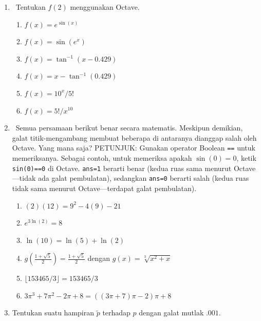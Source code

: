 \begin{enumerate}
\begin{enumerate}
\item $\lfloor\ln(234567)\rfloor$
\item $e^{\lceil\ln(234567)\rceil}$
\item $\sqrt[3]{\lfloor\sin(e^{5.2})\rfloor}$
\item $-e^{i\pi}$
\item $4\tan^{-1}(1)$
\item ${\displaystyle \frac{\lfloor\cos(3)-\sqrt[5]{\ln(3)}\rfloor}{\lceil\arctan(3)-e^{3}\rceil}}$
\end{enumerate}
\item \octave\ Tentukan $f(2)$ menggunakan Octave.

\begin{enumerate}
\item \label{exc:abserr12}$f(x)=e^{\sin(x)}$ \hasasolution 
\item $f(x)=\sin\left(e^{x}\right)$
\item \label{exc:abserr13}${\displaystyle f(x)=\tan^{-1}(x-0.429)}$ \hasasolution 
\item $f(x)=x-\tan^{-1}(0.429)$
\item \label{exc:abserr14}$f(x)=10^{x}/5!$ \hasananswer 
\item $f(x)=5!/x^{10}$
\end{enumerate}
\item \octave\ Semua persamaan berikut benar secara matematis. Meskipun
demikian, galat titik-mengambang membuat beberapa di antaranya dianggap
salah oleh Octave. Yang mana saja? PETUNJUK: Gunakan operator Boolean
\texttt{==} untuk memeriksanya. Sebagai contoh, untuk memeriksa apakah
$\sin(0)=0$, ketik \texttt{sin(0)==0} di Octave. \texttt{ans=1} berarti
benar (kedua ruas sama menurut Octave---tidak ada galat pembulatan),
sedangkan \texttt{ans=0} berarti salah (kedua ruas tidak sama menurut
Octave---terdapat galat pembulatan).

\begin{enumerate}
\item $(2)(12)=9^{2}-4(9)-21$
\item $e^{3\ln(2)}=8$
\item $\ln(10)=\ln(5)+\ln(2)$
\item $g(\frac{1+\sqrt{5}}{2})=\frac{1+\sqrt{5}}{2}$ dengan $g(x)=\sqrt[3]{x^{2}+x}$
\item $\lfloor153465/3\rfloor=153465/3$
\item $3\pi^{3}+7\pi^{2}-2\pi+8=((3\pi+7)\pi-2)\pi+8$
\end{enumerate}
\item \label{ex:absoluteError2}Tentukan suatu hampiran $\tilde{p}$ terhadap
$p$ dengan galat mutlak $.001$.


\end{enumerate}
